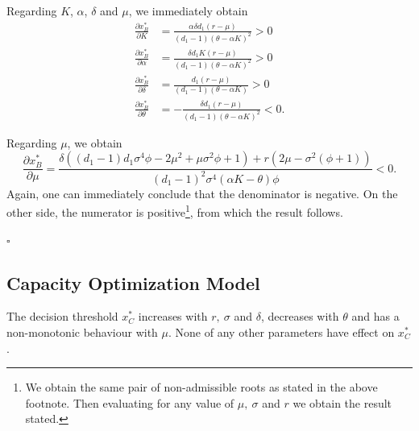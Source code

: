 Regarding $K$, $\alpha$, $\delta$ and $\mu$, we  immediately obtain
\begin{align*}
\frac{\partial x^*_B}{\partial K}&=\frac{\alpha  \delta  d_1 (r-\mu )}{(d_1-1) (\theta -\alpha  K)^2}>0\\
\frac{\partial x^*_B}{\partial \alpha}&=\frac{\delta  d_1 K (r-\mu )}{(d_1-1) (\theta -\alpha K)^2}>0\\
\frac{\partial x^*_B}{\partial \delta}&=\frac{d_1 (r-\mu )}{(d_1-1) (\theta -\alpha  K)}>0\\
\frac{\partial x^*_B}{\partial \theta}&=-\frac{\delta  d_1 (r-\mu )}{(d_1-1) (\theta -\alpha  K)^2}<0.
\end{align*}


Regarding $\mu$, we obtain
$$\frac{\partial x^*_B}{\partial \mu}= \frac{   \delta \left( (d_1-1) d_1 \sigma ^4 \phi -2 \mu ^2+\mu  \sigma ^2 \phi+1 \right)+r \left(2 \mu -\sigma ^2 \left(\phi+1\right)\right)}{(d_1-1)^2 \sigma ^4 (\alpha K-\theta ) \phi}<0.$$
Again, one can immediately conclude that the denominator is negative. On the other side, the numerator is positive\footnote{We obtain the same pair of non-admissible roots as stated in the above footnote. Then evaluating for any value of $\mu, \ \sigma$ and $r$ we obtain the result stated.}, from which the result follows. %
 
 
\begin{flushright}
 $\square$
\end{flushright}


\subsection{Capacity Optimization Model}

\begin{prop}
	\label{1_prop2}
The decision threshold $x^*_C$ increases with $r, \ \sigma$ and $\delta$, decreases with $\theta$ and has a non-monotonic behaviour with  $\mu$. None of any other parameters have effect on $x^*_C$.
\end{prop}

